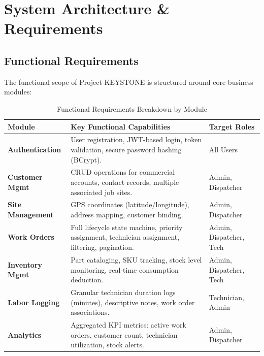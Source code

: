 \documentclass[12pt,a4paper,oneside]{report}
\begin{document}
\newpage
\chapter{System Architecture \& Requirements}

\section{Functional Requirements}
The functional scope of Project KEYSTONE is structured around core business modules:

\begin{table}[htbp]
    \centering
    \caption{Functional Requirements Breakdown by Module}
    \label{tab:functional_reqs}
    \begin{tabularx}{\textwidth}{lXl}
        \toprule
        \textbf{Module} & \textbf{Key Functional Capabilities} & \textbf{Target Roles} \\
        \midrule
        \textbf{Authentication} & User registration, JWT-based login, token validation, secure password hashing (BCrypt). & All Users \\
        \textbf{Customer Mgmt} & CRUD operations for commercial accounts, contact records, multiple associated job sites. & Admin, Dispatcher \\
        \textbf{Site Management} & GPS coordinates (latitude/longitude), address mapping, customer binding. & Admin, Dispatcher \\
        \textbf{Work Orders} & Full lifecycle state machine, priority assignment, technician assignment, filtering, pagination. & Admin, Dispatcher, Tech \\
        \textbf{Inventory Mgmt} & Part cataloging, SKU tracking, stock level monitoring, real-time consumption deduction. & Admin, Dispatcher, Tech \\
        \textbf{Labor Logging} & Granular technician duration logs (minutes), descriptive notes, work order associations. & Technician, Admin \\
        \textbf{Analytics} & Aggregated KPI metrics: active work orders, customer count, technician utilization, stock alerts. & Admin, Dispatcher \\
        \bottomrule
    \end{tabularx}
\end{table}
\end{document}
